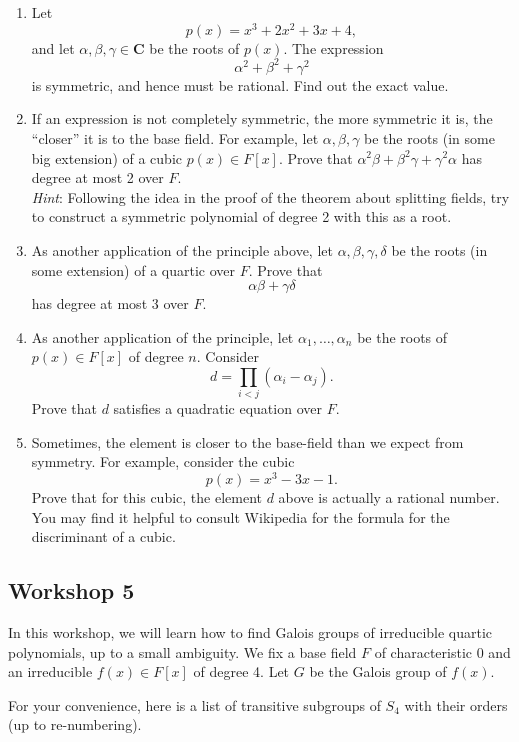 \documentclass[11pt]{article}
\begin{document}
\begin{enumerate}
\item Let
\[ p(x) = x^3 + 2x^2 + 3x + 4,\]
and let \(\alpha, \beta, \gamma \in \mathbf{C}\) be the roots of \(p(x)\).
The expression
\[ \alpha^2 + \beta^2 + \gamma^{2}\]
is symmetric, and hence must be rational.
Find out the exact value.

\item If an expression is not completely symmetric, the more symmetric it is, the ``closer'' it is to the base field.
For example, let \(\alpha, \beta, \gamma\) be the roots (in some big extension) of a cubic \(p(x) \in F[x]\).
Prove that \(\alpha^2 \beta + \beta^2 \gamma + \gamma^2\alpha\) has degree at most 2 over \(F\).\\
\emph{Hint}: Following the idea in the proof of the theorem about splitting fields, try to construct a symmetric polynomial of degree 2 with this as a root.

\item As another application of the principle above, let \(\alpha, \beta, \gamma, \delta\) be the roots (in some extension) of a quartic over \(F\).
Prove that
\[ \alpha\beta + \gamma\delta\]
has degree at most 3 over \(F\).

\item As another application of the principle, let \(\alpha_1, \dots, \alpha_n\) be the roots of \(p(x) \in F[x]\) of degree \(n\).
Consider
\[ d = \prod_{i < j}(\alpha_i - \alpha_j).\]
Prove that \(d\) satisfies a quadratic equation over \(F\).

\item Sometimes, the element is closer to the base-field than we expect from symmetry.
For example, consider the cubic
\[ p(x) = x^3-3x-1.\]
Prove that for this cubic, the element \(d\) above is actually a rational number.
You may find it helpful to consult Wikipedia for the formula for the discriminant of a cubic.
\end{enumerate}
\subsection{Workshop 5}
\label{sec:org7f97ce2}
In this workshop, we will learn how to find Galois groups of irreducible quartic polynomials, up to a small ambiguity.
We fix a base field \(F\) of characteristic 0 and an irreducible \(f(x) \in F[x]\) of degree 4.
Let \(G\) be the Galois group of \(f(x)\).

For your convenience, here is a list of transitive subgroups of \(S_{4}\) with their orders (up to re-numbering).
\end{document}
